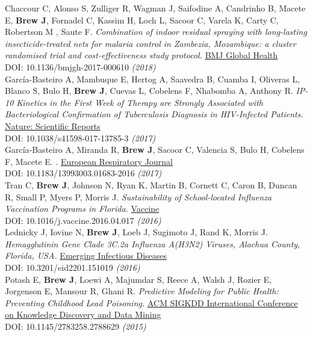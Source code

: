 \documentclass[11pt]{article}
\begin{document}
\noindent Chaccour C, Alonso S, Zulliger R, Wagman J, Saifodine A, Candrinho B, Macete E, \textbf{Brew J}, Fornadel C, Kassim H, Loch L, Sacoor C, Varela K,  Carty C, Robertson  M , Saute F. \emph{Combination of indoor residual spraying with long-lasting insecticide-treated nets for malaria control in Zambezia, Mozambique: a cluster randomised trial and cost-effectiveness study protocol.} \href{http://gh.bmj.com/content/3/1/e000610}{BMJ Global Health} \\ DOI: 10.1136/bmjgh-2017-000610 \hfill \emph{(2018)} \\

\noindent García-Basteiro A, Mambuque E, Hertog A, Saavedra B, Cuamba I, Oliveras L, Blanco S, Bulo H, \textbf{Brew J}, Cuevas L, Cobelens F, Nhabomba A, Anthony R. \emph{IP-10 Kinetics in the First Week of Therapy are Strongly Associated with Bacteriological Confirmation of Tuberculosis Diagnosis in HIV-Infected Patients.} \href{https://www.nature.com/articles/s41598-017-13785-3}{Nature: Scientific Reports} \\ DOI: 10.1038/s41598-017-13785-3 \hfill \emph{(2017)} \\

\noindent García-Basteiro A, Miranda R, \textbf{Brew J}, Sacoor C, Valencia S, Bulo H, Cobelens F, Macete E. . \href{http://erj.ersjournals.com}{European Respiratory Journal} \\
DOI: 10.1183/13993003.01683-2016 \hfill \emph{(2017)} \\

\noindent Tran C, \textbf{Brew J}, Johnson N, Ryan K, Martin B, Cornett C, Caron B, Duncan R, Small P, Myers P, Morris J. \emph{Sustainability of School-located Influenza Vaccination Programs in Florida.} \href{http://www.journals.elsevier.com/vaccine}{Vaccine} \\
DOI: 10.1016/j.vaccine.2016.04.017 \hfill \emph{(2016)} \\

\noindent Lednicky J, Iovine N, \textbf{Brew J}, Loeb J, Sugimoto J, Rand K, Morris J. \emph{Hemagglutinin Gene Clade 3C.2a Influenza A(H3N2) Viruses, Alachua County, Florida, USA.} \href{http://wwwnc.cdc.gov/eid/article/22/1/15-1019_article}{Emerging Infectious Diseases} \\
DOI: 10.3201/eid2201.151019 \hfill \emph{(2016)} \\

\noindent Potash E, \textbf{Brew J}, Loewi A, Majumdar S, Reece A, Walsh J, Rozier E, Jorgenson E, Mansour R, Ghani R. \emph{Predictive Modeling for Public Health: Preventing Childhood Lead Poisoning.} \href{http://dl.acm.org/citation.cfm?id=2788629&dl=ACM&coll=DL&CFID=747855435&CFTOKEN=56343631}{ACM SIGKDD International Conference on Knowledge Discovery and Data Mining} \\  
DOI: 10.1145/2783258.2788629 \hfill \emph{(2015)}\\
\end{document}
